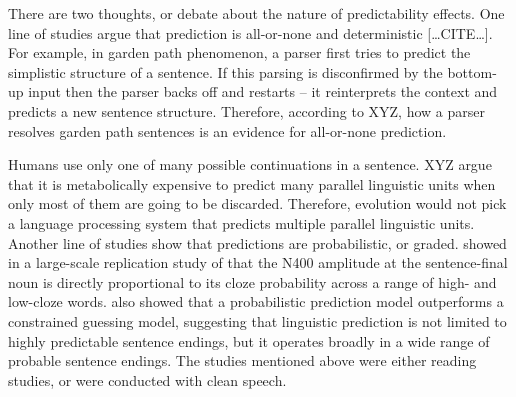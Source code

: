 \documentclass[a4paper, nobind]{templates/ociamthesis}
\begin{document}
There are two thoughts, or debate about the nature of predictability effects.
One line of studies argue that prediction is all-or-none and deterministic {[}\ldots CITE\ldots{]}.
For example, in garden path phenomenon, a parser first tries to predict the simplistic structure of a sentence.
If this parsing is disconfirmed by the bottom-up input then the parser backs off and restarts -- it reinterprets the context and predicts a new sentence structure.
Therefore, according to XYZ, how a parser resolves garden path sentences is an evidence for all-or-none prediction.

Humans use only one of many possible continuations in a sentence.
XYZ argue that it is metabolically expensive to predict many parallel linguistic units when only most of them are going to be discarded.
Therefore, evolution would not pick a language processing system that predicts multiple parallel linguistic units.
Another line of studies show that predictions are probabilistic, or graded.
\textcite{Nieuwland2018} showed in a large-scale replication study of \textcite{Delong2005} that the N400 amplitude at the sentence-final noun is directly proportional to its cloze probability across a range of high- and low-cloze words.
\textcite{Heilbron2020} also showed that a probabilistic prediction model outperforms a constrained guessing model, suggesting that linguistic prediction is not limited to highly predictable sentence endings, but it operates broadly in a wide range of probable sentence endings.
The studies mentioned above were either reading studies, or were conducted with clean speech.
\end{document}
